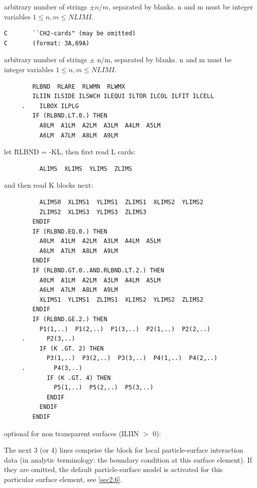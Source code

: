 arbitrary number of strings $\pm n/m$, separated by blanks. n and m
must be integer variables $1\le n,m\le NLIMI$.

\begin{lstlisting}
C       ``CH2-cards" (may be omitted)
C       (format: 3A,69A)
\end{lstlisting}

arbitrary number of strings $\pm$ n/m, separated by blanks. n and m
must be integer variables $1\le n,m\le NLIMI$.

\begin{lstlisting}
        RLBND  RLARE  RLWMN  RLWMX
        ILIIN ILSIDE ILSWCH ILEQUI ILTOR ILCOL ILFIT ILCELL 
     .    ILBOX ILPLG
        IF (RLBND.LT.0.) THEN
          A0LM  A1LM  A2LM  A3LM  A4LM  A5LM
          A6LM  A7LM  A8LM  A9LM
\end{lstlisting}

let RLBND = -KL, then first read L cards:

\begin{lstlisting}
          ALIMS  XLIMS  YLIMS  ZLIMS
\end{lstlisting}

and then read K blocks next:

\begin{lstlisting}
          ALIMS0  XLIMS1  YLIMS1  ZLIMS1  XLIMS2  YLIMS2
          ZLIMS2  XLIMS3  YLIMS3  ZLIMS3
        ENDIF
        IF (RLBND.EQ.0.) THEN
          A0LM  A1LM  A2LM  A3LM  A4LM  A5LM
          A6LM  A7LM  A8LM  A9LM
        ENDIF
        IF (RLBND.GT.0..AND.RLBND.LT.2.) THEN
          A0LM  A1LM  A2LM  A3LM  A4LM  A5LM
          A6LM  A7LM  A8LM  A9LM
          XLIMS1  YLIMS1  ZLIMS1  XLIMS2  YLIMS2  ZLIMS2
        ENDIF
        IF (RLBND.GE.2.) THEN
          P1(1,..)  P1(2,..)  P1(3,..)  P2(1,..)  P2(2,..)  
     .      P2(3,..)
          IF (K .GT. 2) THEN
            P3(1,..)  P3(2,..)  P3(3,..)  P4(1,..)  P4(2,..)  
     .        P4(3,..)
            IF (K .GT. 4) THEN
              P5(1,..)  P5(2,..)  P5(3,..)
            ENDIF
          ENDIF
        ENDIF
\end{lstlisting}

optional for non transparent surfaces (ILIIN $>$ 0):

The next 3 (or 4) lines comprise the block for local particle-surface
interaction data (in analytic terminology: the boundary condition at this
surface element).
If they are omitted, the default particle-surface model is activated for this
particular surface element, see \cref{sec2.6}.

